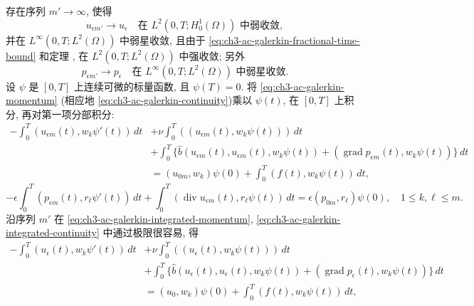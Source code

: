 \begin{Proof}
存在序列 $m'\to\infty$, 使得
\begin{equation}
u_{\epsilon m'}\longrightarrow u_\epsilon
\quad\text{在 }L^2(0,T;H_0^1(\Omega))\text{ 中弱收敛},
\label{eq:ch3-ac-galerkin-velocity-weak-limit}
\end{equation}
并在 $L^\infty(0,T;L^2(\Omega))$ 中弱星收敛, 且由于 \eqref{eq:ch3-ac-galerkin-fractional-time-bound} 和定理 , 在 $L^2(0,T;L^2(\Omega))$ 中强收敛; 另外
\begin{equation}
p_{\epsilon m'}\longrightarrow p_\epsilon
\quad\text{在 }L^\infty(0,T;L^2(\Omega))\text{ 中弱星收敛}.
\label{eq:ch3-ac-galerkin-pressure-weak-limit}
\end{equation}
设 $\psi$ 是 $[0,T]$ 上连续可微的标量函数, 且 $\psi(T)=0$. 将 \eqref{eq:ch3-ac-galerkin-momentum} (相应地 \eqref{eq:ch3-ac-galerkin-continuity})乘以 $\psi(t)$, 在 $[0,T]$ 上积分, 再对第一项分部积分:
\begin{equation}
\begin{aligned}
-\int_0^T(u_{\epsilon m}(t),w_k\psi'(t))\,dt
&+\nu\int_0^T((u_{\epsilon m}(t),w_k\psi(t)))\,dt\\
&+\int_0^T\{\widehat b(u_{\epsilon m}(t),u_{\epsilon m}(t),w_k\psi(t))
+(\operatorname{grad}p_{\epsilon m}(t),w_k\psi(t))\}\,dt\\
&=(u_{0m},w_k)\psi(0)+\int_0^T(f(t),w_k\psi(t))\,dt,
\end{aligned}
\label{eq:ch3-ac-galerkin-integrated-momentum}
\end{equation}
\begin{equation}
-\epsilon\int_0^T(p_{\epsilon m}(t),r_\ell\psi'(t))\,dt
+\int_0^T(\operatorname{div}u_{\epsilon m}(t),r_\ell\psi(t))\,dt
=\epsilon(p_{0m},r_\ell)\psi(0),
\quad1\leq k,\ell\leq m.
\label{eq:ch3-ac-galerkin-integrated-continuity}
\end{equation}
沿序列 $m'$ 在 \eqref{eq:ch3-ac-galerkin-integrated-momentum}, \eqref{eq:ch3-ac-galerkin-integrated-continuity} 中通过极限很容易, 得
\begin{equation}
\begin{aligned}
-\int_0^T(u_\epsilon(t),w_k\psi'(t))\,dt
&+\nu\int_0^T((u_\epsilon(t),w_k\psi(t)))\,dt\\
&+\int_0^T\{\widehat b(u_\epsilon(t),u_\epsilon(t),w_k\psi(t))
+(\operatorname{grad}p_\epsilon(t),w_k\psi(t))\}\,dt\\
&=(u_0,w_k)\psi(0)+\int_0^T(f(t),w_k\psi(t))\,dt,
\end{aligned}
\label{eq:ch3-ac-limit-integrated-momentum}
\end{equation}

\end{Proof}
